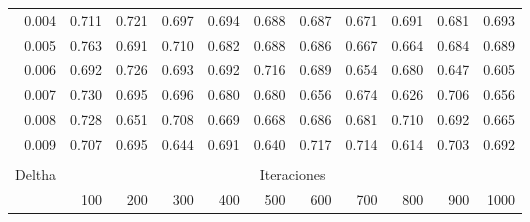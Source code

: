 \begin{table}[H]
\begin{tabular}{rrrrrrrrrrr}
0.004                      & 0.711                & 0.721                & 0.697                & 0.694                & 0.688                & 0.687                & 0.671                & 0.691                & 0.681                & 0.693                \\
0.005                      & 0.763                & 0.691                & 0.710                & 0.682                & 0.688                & 0.686                & 0.667                & 0.664                & 0.684                & 0.689                \\
0.006                      & 0.692                & 0.726                & 0.693                & 0.692                & 0.716                & 0.689                & 0.654                & 0.680                & 0.647                & 0.605                \\
0.007                      & 0.730                & 0.695                & 0.696                & 0.680                & 0.680                & 0.656                & 0.674                & 0.626                & 0.706                & 0.656                \\
0.008                      & 0.728                & 0.651                & 0.708                & 0.669                & 0.668                & 0.686                & 0.681                & 0.710                & 0.692                & 0.665                \\
0.009                      & 0.707                & 0.695                & 0.644                & 0.691                & 0.640                & 0.717                & 0.714                & 0.614                & 0.703                & 0.692                \\
\multicolumn{1}{l}{}       & \multicolumn{1}{l}{} & \multicolumn{1}{l}{} & \multicolumn{1}{l}{} & \multicolumn{1}{l}{} & \multicolumn{1}{l}{} & \multicolumn{1}{l}{} & \multicolumn{1}{l}{} & \multicolumn{1}{l}{} & \multicolumn{1}{l}{} & \multicolumn{1}{l}{} \\
\multicolumn{1}{l}{Deltha} & \multicolumn{10}{c}{Iteraciones}                                                                                                                                                                                                    \\
\multicolumn{1}{l}{}       & 100                  & 200                  & 300                  & 400                  & 500                  & 600                  & 700                  & 800                  & 900                  & 1000                 \\

\end{tabular}
\end{table}
